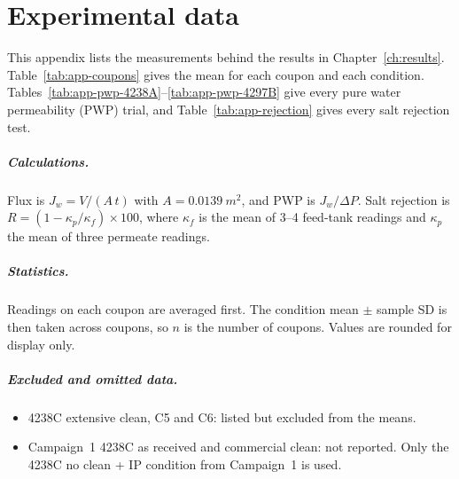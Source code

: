 \chapter{Experimental data}
\label{app:data}

This appendix lists the measurements behind the results in Chapter~\ref{ch:results}. Table~\ref{tab:app-coupons} gives the mean for each coupon and each condition. Tables~\ref{tab:app-pwp-4238A}--\ref{tab:app-pwp-4297B} give every pure water permeability (PWP) trial, and Table~\ref{tab:app-rejection} gives every salt rejection test.

\paragraph{Calculations.} Flux is $J_w = V/(A\,t)$ with $A = \qty{0.0139}{m^2}$, and PWP is $J_w/\Delta P$. Salt rejection is $R = (1-\kappa_p/\kappa_f)\times 100$, where $\kappa_f$ is the mean of 3--4 feed-tank readings and $\kappa_p$ the mean of three permeate readings.

\paragraph{Statistics.} Readings on each coupon are averaged first. The condition mean $\pm$ sample SD is then taken across coupons, so $n$ is the number of coupons. Values are rounded for display only.

\paragraph{Excluded and omitted data.}
\begin{itemize}[noitemsep]
  \item 4238C extensive clean, C5 and C6: listed but excluded from the means.
  \item Campaign~1 4238C as received and commercial clean: not reported. Only the 4238C no clean + IP condition from Campaign~1 is used.
\end{itemize}

